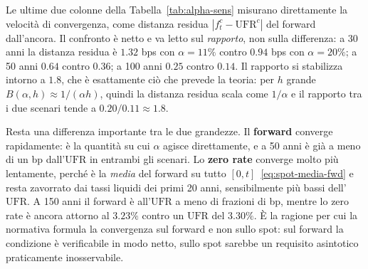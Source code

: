 \documentclass[11pt,a4paper]{article}
\theoremstyle{plain}
\theoremstyle{definition}
\theoremstyle{remark}
\newcommand{\UFR}{\mathrm{UFR}}
\begin{document}


Le ultime due colonne della Tabella~\ref{tab:alpha-sens} misurano direttamente la velocit\`a di
convergenza, come distanza residua $|f^c_t - \UFR^c|$ del forward dall'ancora. Il confronto \`e
netto e va letto sul \emph{rapporto}, non sulla differenza: a 30 anni la distanza residua \`e
$1.32$ bps con $\alpha=11\%$ contro $0.94$ bps con $\alpha=20\%$; a 50 anni $0.64$ contro
$0.36$; a 100 anni $0.25$ contro $0.14$. Il rapporto si stabilizza intorno a $1.8$, che \`e
esattamente ci\`o che prevede la teoria: per $h$ grande $B(\alpha,h)\approx1/(\alpha h)$,
quindi la distanza residua scala come $1/\alpha$ e il rapporto tra i due scenari tende a
$0.20/0.11\approx1.8$.

Resta una differenza importante tra le due grandezze. Il \textbf{forward} converge
rapidamente: \`e la quantit\`a su cui $\alpha$ agisce direttamente, e a 50 anni \`e gi\`a a meno
di un bp dall'$\UFR$ in entrambi gli scenari. Lo \textbf{zero rate} converge molto pi\`u
lentamente, perch\'e \`e la \emph{media} del forward su tutto $[0,t]$~\eqref{eq:spot-media-fwd}
e resta zavorrato dai tassi liquidi dei primi 20 anni, sensibilmente pi\`u bassi dell'$\UFR$.
A 150 anni il forward \`e all'$\UFR$ a meno di frazioni di bp, mentre lo zero rate \`e ancora
attorno al $3.23\%$ contro un $\UFR$ del $3.30\%$. \`E la ragione per cui la normativa formula
la convergenza sul forward e non sullo spot: sul forward la condizione \`e verificabile
in modo netto, sullo spot sarebbe un requisito asintotico praticamente inosservabile.
\end{document}
